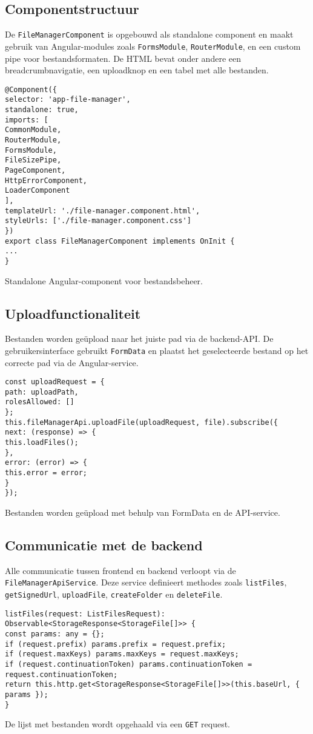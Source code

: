 \subsection{Componentstructuur}
De \texttt{FileManagerComponent} is opgebouwd als standalone component en maakt gebruik van Angular-modules zoals \texttt{FormsModule}, \texttt{RouterModule}, en een custom pipe voor bestandsformaten. De HTML bevat onder andere een breadcrumbnavigatie, een uploadknop en een tabel met alle bestanden.
\begin{listing}[H]
\begin{verbatim}
@Component({
selector: 'app-file-manager',
standalone: true,
imports: [
CommonModule,
RouterModule,
FormsModule,
FileSizePipe,
PageComponent,
HttpErrorComponent,
LoaderComponent
],
templateUrl: './file-manager.component.html',
styleUrls: ['./file-manager.component.css']
})
export class FileManagerComponent implements OnInit {
...
}
\end{verbatim}
\caption[Structuur van de FileManagerComponent]{Standalone Angular-component voor bestandsbeheer.}
\end{listing}
\subsection{Uploadfunctionaliteit}
Bestanden worden geüpload naar het juiste pad via de backend-API. De gebruikersinterface gebruikt \texttt{FormData} en plaatst het geselecteerde bestand op het correcte pad via de Angular-service.
\begin{listing}[H]
\begin{verbatim}
const uploadRequest = {
path: uploadPath,
rolesAllowed: []
};
this.fileManagerApi.uploadFile(uploadRequest, file).subscribe({
next: (response) => {
this.loadFiles();
},
error: (error) => {
this.error = error;
}
});
\end{verbatim}
\caption[Uploadfunctionaliteit in de component]{Bestanden worden geüpload met behulp van FormData en de API-service.}
\end{listing}
\subsection{Communicatie met de backend}
Alle communicatie tussen frontend en backend verloopt via de \texttt{FileManagerApiService}. Deze service definieert methodes zoals \texttt{listFiles}, \texttt{getSignedUrl}, \texttt{uploadFile}, \texttt{createFolder} en \texttt{deleteFile}.
\begin{listing}[H]
\begin{verbatim}
listFiles(request: ListFilesRequest): Observable<StorageResponse<StorageFile[]>> {
const params: any = {};
if (request.prefix) params.prefix = request.prefix;
if (request.maxKeys) params.maxKeys = request.maxKeys;
if (request.continuationToken) params.continuationToken = request.continuationToken;
return this.http.get<StorageResponse<StorageFile[]>>(this.baseUrl, { params });
}
\end{verbatim}
\caption[API-call naar de backend]{De lijst met bestanden wordt opgehaald via een \texttt{GET} request.}
\end{listing}
